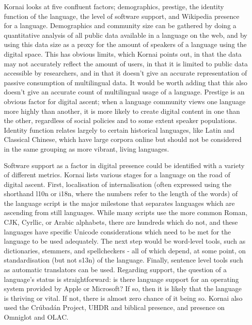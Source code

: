 Kornai looks at five confluent factors; demographics, prestige, the identity function of the language, the level of software support, and Wikipedia presence for a language. Demographics and community size can be gathered by doing a quantitative analysis of all public data available in a language on the web, and by using this data size as a proxy for the amount of speakers of a language using the digital space. This has obvious limits, which Kornai points out, in that the data may not accurately reflect the amount of users, in that it is limited to public data accessible by researchers, and in that it doesn't give an accurate representation of passive consumption of multilingual data. It would be worth adding that this also doesn't give an accurate count of multilingual usage of a language. Prestige is an obvious factor for digital ascent; when a language community views one language more highly than another, it is more likely to create digital content in one than the other, regardless of social policies and to some extent speaker populations. Identity function relates largely to certain historical languages, like Latin and Classical Chinese, which have large corpora online but should not be considered in the same grouping as more vibrant, living languages.

Software support as a factor in digital presence could be identified with a variety of different metrics. Kornai lists various stages for a language on the road of digital ascent. First, localisation of internalisation (often expressed using the shorthand l10n or i18n, where the numbers refer to the length of the words) of the language script is the major milestone that separates languages which are ascending from still languages. While many scripts use the more common Roman, CJK, Cyrllic, or Arabic alphabets, there are hundreds which do not, and these languages have specific Unicode considerations which need to be met for the language to be used adequately. The next step would be word-level tools, such as dictionaries, stemmers, and spellcheckers - all of which depend, at some point, on standardisation (but not s13n) of the language. Finally, sentence level tools such as automatic translators can be used. Regarding support, the question of a language's status is straightforward: is there language support for an operating system provided by Apple or Microsoft? If so, then it is likely that the language is thriving or vital. If not, there is almost zero chance of it being so. Kornai also used the Cr\'ubad\'an Project, UHDR and biblical presence, and presence on Omniglot and OLAC.

